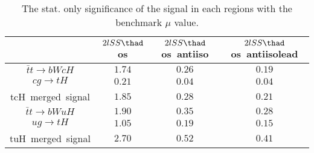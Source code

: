 \begin{table}
\caption{The stat. only significance of the signal in each regions with the benchmark $\mu$ value.}
\centering
\begin{tabular}{|c|c|c|c|} \hline
 & $2lSS\thad$ os & $2lSS\thad$ os~antiiso & $2lSS\thad$ os~antiisolead\\\hline
$\bar{t}t\to bWcH$ & $1.74$ & $0.26$ & $0.19$\\\hline
$cg\to tH$ & $0.21$ & $0.04$ & $0.04$\\\hline
tcH~merged~signal & $1.85$ & $0.28$ & $0.21$\\\hline
$\bar{t}t\to bWuH$ & $1.90$ & $0.35$ & $0.28$\\\hline
$ug\to tH$ & $1.05$ & $0.19$ & $0.15$\\\hline
tuH~merged~signal & $2.70$ & $0.52$ & $0.41$\\\hline
\end{tabular}
\label{tab:significance}
\end{table}
